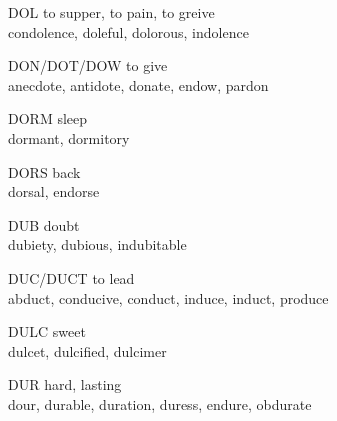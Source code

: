 \begin{flashcard}[Roots]{DOL}
to supper, to pain, to greive\\
\vspace{0.2in}
condolence, doleful, dolorous, indolence\\
\end{flashcard}

\begin{flashcard}[Roots]{DON/DOT/DOW}
to give\\
\vspace{0.2in}
anecdote, antidote, donate, endow, pardon\\
\end{flashcard}

\begin{flashcard}[Roots]{DORM}
sleep\\
\vspace{0.2in}
dormant, dormitory\\
\end{flashcard}

\begin{flashcard}[Roots]{DORS}
back\\
\vspace{0.2in}
dorsal, endorse\\
\end{flashcard}

\begin{flashcard}[Roots]{DUB}
doubt\\
\vspace{0.2in}
dubiety, dubious, indubitable\\
\end{flashcard}

\begin{flashcard}[Roots]{DUC/DUCT}
to lead\\
\vspace{0.2in}
abduct, conducive, conduct, induce, induct, produce\\
\end{flashcard}

\begin{flashcard}[Roots]{DULC}
sweet\\
\vspace{0.2in}
dulcet, dulcified, dulcimer\\
\end{flashcard}

\begin{flashcard}[Roots]{DUR}
hard, lasting\\
\vspace{0.2in}
dour, durable, duration, duress, endure, obdurate\\
\end{flashcard}

